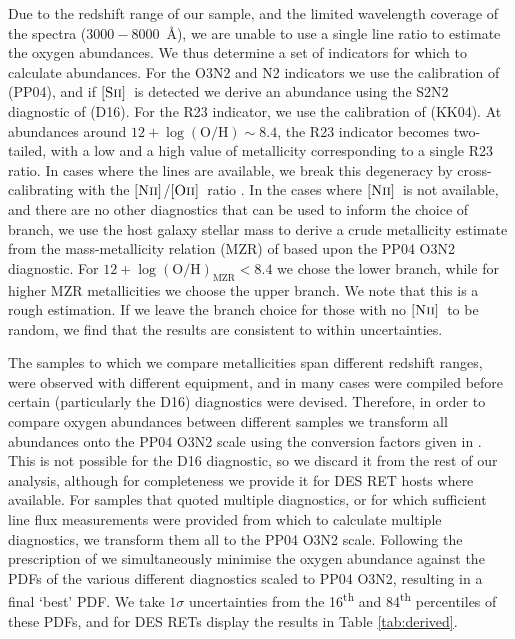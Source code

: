 \documentclass[fleqn,usenatbib,]{mnras}
\newcommand{\OII}[0]{$[\textnormal{\textsc{Oii}}]$}
\newcommand{\SII}[0]{$[\textnormal{\textsc{Sii}}]$}
\newcommand{\NII}[0]{$[\textnormal{\textsc{Nii}}]$}
\begin{document}
Due to the redshift range of our sample, and the limited wavelength coverage of the spectra ($3000-8000$~\AA), we are unable to use a single line ratio to estimate the oxygen abundances. We thus determine a set of indicators for which to calculate abundances. For the O3N2 and N2 indicators we use the calibration of \citet{Pettini2004} (PP04), and if \SII~is detected we derive an abundance using the S2N2 diagnostic of \citet{Dopita2016} (D16). For the R23 indicator, we use the calibration of \citet{Kobulnicky2004} (KK04). At abundances around $12 + \log \mathrm{(O/H)} \sim 8.4$, the R23 indicator becomes two-tailed, with a low and a high value of metallicity corresponding to a single R23 ratio. In cases where the lines are available, we break this degeneracy by cross-calibrating with the \NII/\OII~ratio \citep{Kewley2008}. In the cases where \NII~is not available, and there are no other diagnostics that can be used to inform the choice of branch, we use the host galaxy stellar mass to derive a crude metallicity estimate from the mass-metallicity relation (MZR) of \citet{Kewley2008} based upon the PP04 O3N2 diagnostic. For $12 + \log \mathrm{(O/H)}_{\mathrm{MZR}} < 8.4$ we chose the lower branch, while for higher MZR metallicities we choose the upper branch. We note that this is a rough estimation. If we leave the branch choice for those with no \NII~to be random, we find that the results are consistent to within uncertainties. 

The samples to which we compare metallicities span different redshift ranges, were observed with different equipment, and in many cases were compiled before certain (particularly the D16) diagnostics were devised. Therefore, in order to compare oxygen abundances between different samples we transform all abundances onto the PP04 O3N2 scale using the conversion factors given in \citet{Kewley2008}. This is not possible for the D16 diagnostic, so we discard it from the rest of our analysis, although for completeness we provide it for DES RET hosts where available. For samples that quoted multiple diagnostics, or for which sufficient line flux measurements were provided from which to calculate multiple diagnostics, we transform them all to the PP04 O3N2 scale. Following the prescription of \citet{Kruehler2015} we simultaneously minimise the oxygen abundance against the PDFs of the various different diagnostics scaled to PP04 O3N2, resulting in a final `best' PDF. We take $1\sigma$ uncertainties from the 16\textsuperscript{th} and 84\textsuperscript{th} percentiles of these PDFs, and for DES RETs display the results in Table \ref{tab:derived}.
\end{document}
